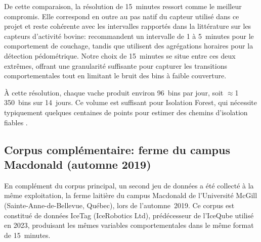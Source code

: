 De cette comparaison, la résolution de 15~minutes ressort comme le meilleur compromis.
Elle correspond en outre au pas natif du capteur utilisé dans ce projet et reste cohérente
avec les intervalles rapportés dans la littérature sur les capteurs d'activité bovine:
\cite{ledgerwood2010lying} recommandent un intervalle de 1 à 5~minutes pour le comportement
de couchage, tandis que \cite{alsaaod2012electronic} utilisent des agrégations horaires
pour la détection pédométrique. Notre choix de 15~minutes se situe
entre ces deux extrêmes, offrant une granularité suffisante pour capturer les transitions
comportementales tout en limitant le bruit des bins à faible couverture.

À cette résolution, chaque vache produit environ 96~bins par jour, soit $\approx$1\,350~bins
sur 14~jours. Ce volume est suffisant pour Isolation Forest, qui nécessite typiquement
quelques centaines de points pour estimer des chemins d'isolation
fiables \citep{liu2008isolation}.

\subsection{Corpus complémentaire: ferme du campus Macdonald (automne 2019)}
\label{subsec:corpus_mcgill}

En complément du corpus principal, un second jeu de données a été collecté à la même
exploitation, la ferme laitière du campus Macdonald de l'Université McGill
(Sainte-Anne-de-Bellevue, Québec), lors de l'automne~2019. Ce corpus est
constitué de données IceTag (IceRobotics Ltd), prédécesseur de l'IceQube utilisé en 2023,
produisant les mêmes variables comportementales dans le même format de 15~minutes.

